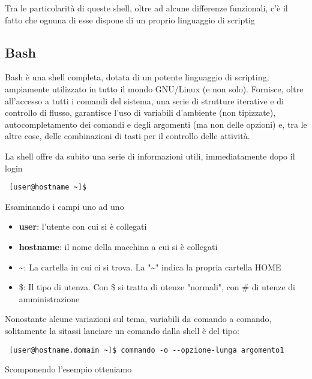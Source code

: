 Tra le particolarità di queste shell, oltre ad alcune differenze funzionali, c'è il fatto che ognuna di esse dispone di un proprio linguaggio di scriptig

\subsection{Bash}

Bash è una shell completa, dotata di un potente linguaggio di scripting, ampiamente utilizzato in tutto il mondo GNU/Linux (e non solo). Fornisce, oltre all'accesso a tutti i comandi del sistema, una serie di strutture iterative e di controllo di flusso, garantisce l'uso di variabili d'ambiente (non tipizzate), autocompletamento dei comandi e degli argomenti (ma non delle opzioni) e, tra le altre cose, delle combinazioni di tasti per il controllo delle attività. 

La shell offre da subito una serie di informazioni utili, immediatamente dopo il login
\begin{verbatim}
 [user@hostname ~]$
\end{verbatim}
Esaminando i campi uno ad uno
\begin{itemize}
 \item \textbf{user}: l'utente con cui si è collegati
 \item \textbf{hostname}: il nome della macchina a cui si è collegati
 \item \textasciitilde: La cartella in cui ci si trova. La "\textasciitilde" indica la propria cartella HOME
 \item \$: Il tipo di utenza. Con \$ si tratta di utenze "normali", con \# di utenze di amministrazione
\end{itemize}

Nonostante alcune variazioni sul tema, variabili da comando a comando, solitamente la sitassi lanciare un comando dalla shell è del tipo:

\begin{verbatim}
 [user@hostname.domain ~]$ commando -o --opzione-lunga argomento1 
\end{verbatim}

Scomponendo l'esempio otteniamo

